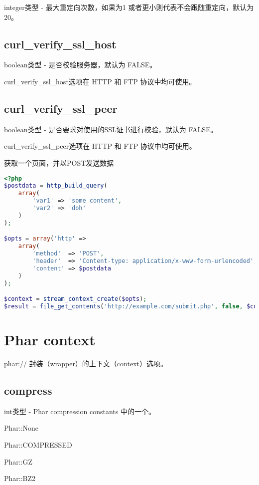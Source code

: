 integer类型 - 最大重定向次数，如果为1 或者更小则代表不会跟随重定向，默认为 20。

\subsection{curl\_verify\_ssl\_host}

boolean类型 - 是否校验服务器，默认为 FALSE。

curl\_verify\_ssl\_host选项在 HTTP 和 FTP 协议中均可使用。


\subsection{curl\_verify\_ssl\_peer}


boolean类型 - 是否要求对使用的SSL证书进行校验，默认为 FALSE。

curl\_verify\_ssl\_peer选项在 HTTP 和 FTP 协议中均可使用。



\begin{example}
获取一个页面，并以POST发送数据
\begin{lstlisting}[language=PHP]
<?php
$postdata = http_build_query(
    array(
        'var1' => 'some content',
        'var2' => 'doh'
    )
);

$opts = array('http' =>
    array(
        'method'  => 'POST',
        'header'  => 'Content-type: application/x-www-form-urlencoded',
        'content' => $postdata
    )
);

$context = stream_context_create($opts);
$result = file_get_contents('http://example.com/submit.php', false, $context);
\end{lstlisting}
\end{example}


\section{Phar context}

phar:// 封装（wrapper）的上下文（context）选项。

\subsection{compress}

int类型 - Phar compression constants 中的一个。

\begin{compactitem}
\item Phar::None
\item Phar::COMPRESSED
\item Phar::GZ
\item Phar::BZ2
\end{compactitem}

